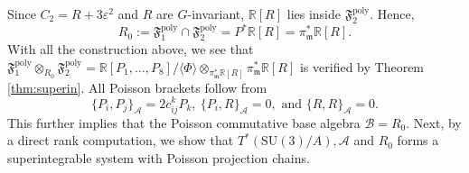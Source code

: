 \documentclass[11pt]{amsart}
\theoremstyle{definition}
\theoremstyle{plain}
\theoremstyle{conclusion}
\begin{document}
Since $C_2=R+3\varepsilon^2$ and $R$ are $G$-invariant, $\mathbb{R}[R]$ lies inside $\mathfrak{F}_2^{\mathrm{poly}}$.  Hence, $$ R_0:=\mathfrak{F}_1^{\mathrm{poly}}\cap \mathfrak{F}_2^{\mathrm{poly}}    = P^*\mathbb{R}[R] = \pi_\mathfrak{m}^* \mathbb{R}[R].$$ With all the construction above, we see that $ \mathfrak{F}_1^{\mathrm{poly}}\otimes_{R_0}\mathfrak{F}_2^{\mathrm{poly}}  = \mathbb{R}[P_1,\ldots,P_8]/\langle \Phi \rangle \otimes_{\pi_\mathfrak{m}^* \mathbb{R}[R]} \pi_\mathfrak{m}^* \mathbb{R}[R]$ is verified by Theorem \ref{thm:superin}.  All Poisson brackets follow from $$\{P_i,P_j\}_\mathcal{A} =  2c_{ij}^k P_k, \  \{P_i,R\}_\mathcal{A} = 0, \text{ and } \{R,R\}_\mathcal{A} = 0.$$ This further implies that the Poisson commutative base algebra $\mathcal{B} = R_0$. Next, by a direct rank computation, we show that $T^*(\mathrm{SU}(3)/A), \mathcal{A}$ and $R_0$ forms a superintegrable system with Poisson projection chains. %
\end{document}
